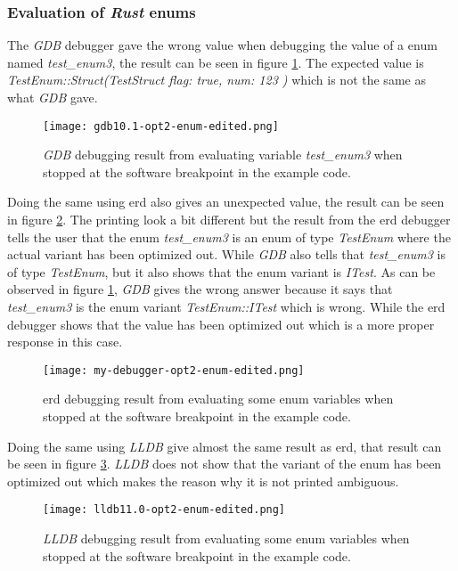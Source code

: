 \subsubsection{Evaluation of \emph{Rust} enums}
The \emph{GDB} debugger gave the wrong value when debugging the value of a enum named \emph{test\_enum3}, the result can be seen in figure \ref{fig:gdbenum}.
The expected value is \emph{TestEnum::Struct(TestStruct { flag: true, num: 123 })} which is not the same as what \emph{GDB} gave.


\begin{figure}[h]
	\centering
	\texttt{[image: gdb10.1-opt2-enum-edited.png]}
	\caption{\emph{GDB} debugging result from evaluating variable \emph{test\_enum3} when stopped at the software breakpoint in the example code.}
	\label{fig:gdbenum}
\end{figure}


Doing the same using \gls{erd} also gives an unexpected value, the result can be seen in  figure \ref{fig:mydebuggerenum}.
The printing look a bit different but the result from the \gls{erd} debugger tells the user that the enum \emph{test\_enum3} is an enum of type \emph{TestEnum} where the actual variant has been optimized out.
While \emph{GDB} also tells that \emph{test\_enum3} is of type \emph{TestEnum}, but it also shows that the enum variant is \emph{ITest}.
As can be observed in figure \ref{fig:gdbenum}, \emph{GDB} gives the wrong answer because it says that \emph{test\_enum3} is the enum variant \emph{TestEnum::ITest} which is wrong.
While the \gls{erd} debugger shows that the value has been optimized out which is a more proper response in this case.


\begin{figure}[h]
	\centering
	\texttt{[image: my-debugger-opt2-enum-edited.png]}
	\caption{\acrshort{erd} debugging result from evaluating some enum variables when stopped at the software breakpoint in the example code.}
	\label{fig:mydebuggerenum}
\end{figure}


Doing the same using \emph{LLDB} give almost the same result as \gls{erd}, that result can be seen in figure \ref{fig:lldbenum}.
\emph{LLDB} does not show that the variant of the enum has been optimized out which makes the reason why it is not printed ambiguous.


\begin{figure}[h]
	\centering
	\texttt{[image: lldb11.0-opt2-enum-edited.png]}
	\caption{\emph{LLDB} debugging result from evaluating some enum variables when stopped at the software breakpoint in the example code.}
	\label{fig:lldbenum}
\end{figure}


